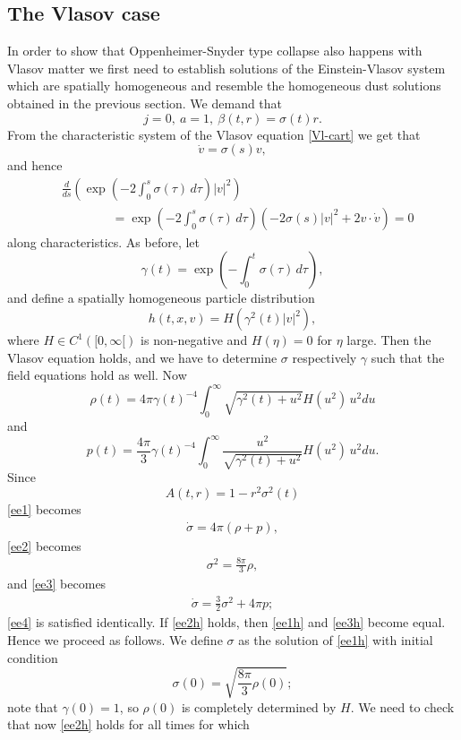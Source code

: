 \documentclass[11pt]{article}
\begin{document}
\subsection{The Vlasov case} \label{subsec_homvlasov}
%
%
In order to show that Oppenheimer-Snyder type collapse also happens with
Vlasov matter we first need to establish solutions of the Einstein-Vlasov
system which are spatially homogeneous and resemble the homogeneous
dust solutions obtained in the previous section.
We demand that
\[
j=0,\ a=1,\ \beta(t,r) = \sigma(t) r.
\]
From the characteristic system of the Vlasov equation
\eqref{Vl-cart} we get that
\[
\dot v = \sigma(s) v,
\]
and hence
\begin{align*}
  &\frac{d}{ds}
  \left(\exp\left(-2\int_0^s \sigma(\tau)\, d\tau\right) |v|^2\right)\\
  &\qquad \qquad =
  \exp\left(-2\int_0^s \sigma(\tau)\, d\tau\right)
  \left(-2 \sigma(s) |v|^2 + 2 v\cdot \dot v \right) =0
\end{align*}
along characteristics. As before, let
\[
\gamma(t) = \exp\left(-\int_0^t \sigma(\tau)\, d\tau\right), 
\]
and define a spatially homogeneous particle distribution
\[
h(t,x,v) = H(\gamma^2(t) |v|^2),
\]
where $H\in C^1([0,\infty[)$ is non-negative and $H(\eta)=0$ for $\eta$
large. Then the Vlasov equation holds, and we have to determine
$\sigma$ respectively $\gamma$ such that
the field equations hold as well.
Now
\[
\rho(t) = 4\pi \gamma(t)^{-4} \int_0^\infty \sqrt{\gamma^2(t) + u^2}
H(u^2)\, u^2 du
\]
and
\[
p(t) = \frac{4\pi}{3} \gamma(t)^{-4} \int_0^\infty
\frac{u^2}{\sqrt{\gamma^2(t) + u^2}}
H(u^2)\, u^2 du .
\]
Since
\[
A(t,r) = 1-r^2 \sigma^2(t)
\]
\eqref{ee1} becomes
\begin{align} \label{ee1h}
\dot \sigma = 4\pi (\rho + p),
\end{align}
\eqref{ee2} becomes
\begin{align}\label{ee2h}
\sigma^2 = \frac{8\pi}{3} \rho,
\end{align}
and \eqref{ee3} becomes
\begin{align}\label{ee3h}
\dot\sigma = \frac{3}{2} \sigma^2 + 4\pi p;
\end{align}
\eqref{ee4} is satisfied identically.
If \eqref{ee2h} holds, then \eqref{ee1h} and \eqref{ee3h} become equal.
Hence we proceed as follows. We define $\sigma$ as the solution of
\eqref{ee1h} with initial condition
\[
\sigma(0) = \sqrt{\frac{8 \pi}{3} \rho(0)};
\]
note that $\gamma(0)=1$, so $\rho(0)$ is completely determined by $H$.
We need to check that now \eqref{ee2h} holds for all times for which
\end{document}
